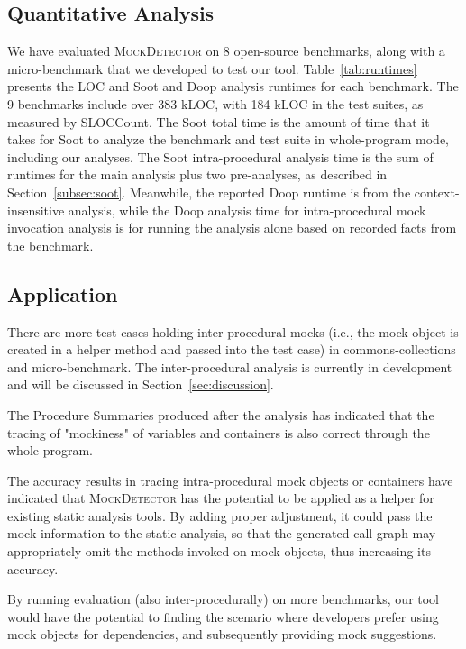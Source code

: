 \subsection{Quantitative Analysis}
\label{subsec:effectiveness}

We have evaluated \textsc{MockDetector} on 8 open-source benchmarks, along with a micro-benchmark that we developed to test our tool. Table~\ref{tab:runtimes} presents the LOC and Soot and Doop analysis runtimes for each benchmark. The 9 benchmarks include over 383 kLOC, with 184 kLOC in the test suites, as measured by SLOCCount. The Soot total time is the amount of time that it takes for Soot to analyze the benchmark and test suite in whole-program mode, including our analyses. The Soot intra-procedural analysis time is the sum of runtimes for the main analysis plus two pre-analyses, as described in Section~\ref{subsec:soot}. Meanwhile, the reported Doop runtime is from the context-insensitive analysis, while the Doop analysis time for intra-procedural mock invocation analysis is for running the analysis alone based on recorded facts from the benchmark.

\subsection{Application}
\label{subsec:static}

There are more test cases holding inter-procedural mocks (i.e., the mock object is created in a helper method and passed into the test case) in commons-collections and micro-benchmark. The inter-procedural analysis is currently in development and will be discussed in Section~\ref{sec:discussion}.

The Procedure Summaries produced after the analysis has indicated that the tracing of "mockiness" of variables and containers is also correct through the whole program. 

The accuracy results in tracing intra-procedural mock objects or containers have indicated that \textsc{MockDetector} has the potential to be applied as a helper for existing static analysis tools. By adding proper adjustment, it could pass the mock information to the static analysis, so that the generated call graph may appropriately omit the methods invoked on mock objects, thus increasing its accuracy.

By running evaluation (also inter-procedurally) on more benchmarks, our tool would have the potential to finding the scenario where developers prefer using mock objects for dependencies, and subsequently providing mock suggestions.

